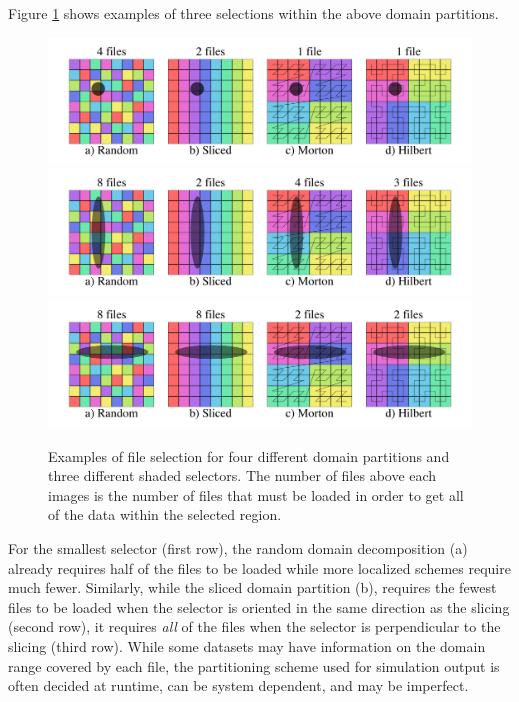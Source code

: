 \documentclass[apjl]{emulateapj}
\begin{document}
Figure \ref{fig:selectors} shows examples of three selections within the above domain partitions. 
%
\begin{figure}[htbp]
\begin{center}
\includegraphics[width=\columnwidth,keepaspectratio]{../images/selector1.png}
\includegraphics[width=\columnwidth,keepaspectratio]{../images/selector5.png}
\includegraphics[width=\columnwidth,keepaspectratio]{../images/selector4.png}
\caption{Examples of file selection for four different domain partitions and three different shaded selectors. The number of files above each images is the number of files that must be loaded in order to get all of the data within the selected region.}
\label{fig:selectors}
\end{center}
\end{figure}
%
For the smallest selector (first row), the random domain decomposition (a) already requires half of the files to be loaded while more localized schemes require much fewer. Similarly, while the sliced domain partition (b), requires the fewest files to be loaded when the selector is oriented in the same direction as the slicing (second row), it requires \textit{all} of the files when the selector is perpendicular to the slicing (third row). While some datasets may have information on the domain range covered by each file, the partitioning scheme used for simulation output is often decided at runtime, can be system dependent, and may be imperfect. 
\end{document}
